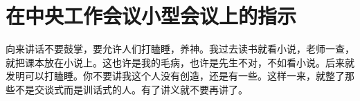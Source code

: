 \section[在中央工作会议小型会议上的指示（一九六四年）]{在中央工作会议小型会议上的指示}


向来讲话不要鼓掌，要允许人们打瞌睡，养神。我过去读书就看小说，老师一查，就把课本放在小说上。这也许是我的毛病，也许是先生不对，不如看小说。后来就发明可以打瞌睡。你不要讲我这个人没有创造，还是有一些。这样一来，就整了那些不是交谈式而是训话式的人。有了讲义就不要再讲了。


